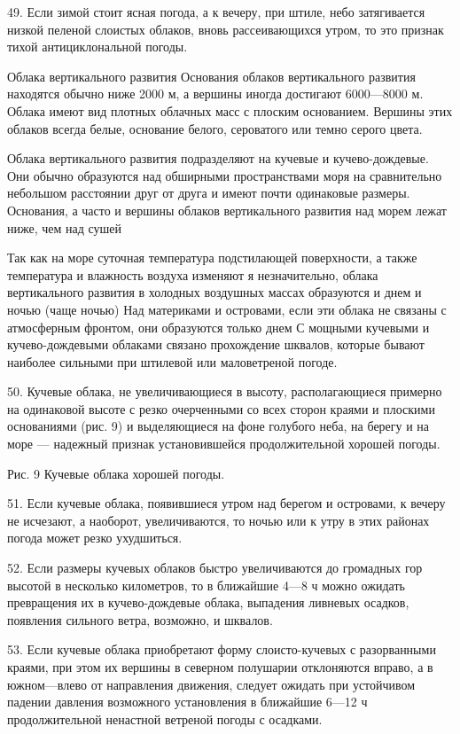 49. Если зимой стоит ясная погода, а к вечеру, при штиле, небо затягивается низкой пеленой слоистых облаков, вновь рассеивающихся утром, то это признак тихой антициклональной погоды.

Облака вертикального развития
Основания облаков вертикального развития находятся обычно ниже 2000 м, а вершины иногда достигают 6000—8000 м. Облака имеют вид плотных облачных масс с плоским основанием. Вершины этих облаков всегда белые, основание белого, сероватого или темно серого цвета.

Облака вертикального развития подразделяют на кучевые и кучево-дождевые. Они обычно образуются над обширными пространствами моря на сравнительно небольшом расстоянии друг от друга и имеют почти одинаковые размеры. Основания, а часто и вершины облаков вертикального развития над морем лежат ниже, чем над сушей

Так как на море суточная температура подстилающей поверхности, а также температура и влажность воздуха изменяют я незначительно, облака вертикального развития в холодных воздушных массах образуются и днем и ночью (чаще ночью) Над материками и островами, если эти облака не связаны с атмосферным фронтом, они образуются только днем С мощными кучевыми и кучево-дождевыми облаками связано прохождение шквалов, которые бывают наиболее сильными при штилевой или маловетреной погоде.

50. Кучевые облака, не увеличивающиеся в высоту, располагающиеся примерно на одинаковой высоте с резко очерченными со всех сторон краями и плоскими основаниями (рис. 9) и выделяющиеся на фоне голубого неба, на берегу и на море — надежный признак установившейся продолжительной хорошей погоды.


Рис. 9 Кучевые облака хорошей погоды.

51. Если кучевые облака, появившиеся утром над берегом и островами, к вечеру не исчезают, а наоборот, увеличиваются, то ночью или к утру в этих районах погода может резко ухудшиться.

52. Если размеры кучевых облаков быстро увеличиваются до громадных гор высотой в несколько километров, то в ближайшие 4—8 ч можно ожидать превращения их в кучево-дождевые облака, выпадения ливневых осадков, появления сильного ветра, возможно, и шквалов.

53. Если кучевые облака приобретают форму слоисто-кучевых с разорванными краями, при этом их вершины в северном полушарии отклоняются вправо, а в южном—влево от направления движения, следует ожидать при устойчивом падении давления возможного установления в ближайшие 6—12 ч продолжительной ненастной ветреной погоды с осадками.

